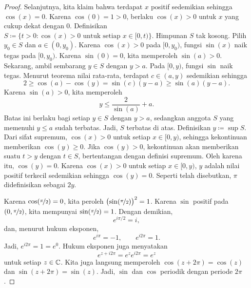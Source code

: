 \begin{proof}
Selanjutnya, kita klaim bahwa terdapat $x$ positif sedemikian sehingga $\cos(x) = 0$.
Karena $\cos(0) = 1 > 0$, berlaku $\cos(x) > 0$
untuk $x$ yang cukup dekat dengan $0$. Definisikan
$S \coloneqq \{ t > 0 : \cos(x) > 0 \text{ untuk setiap } x \in [0,t) \}$.
Himpunan $S$ tak kosong. Pilih $y_0 \in S$ dan $a \in (0,y_0)$.
Karena $\cos(x) > 0$ pada $[0,y_0)$, fungsi $\sin(x)$ naik tegas
pada $[0,y_0)$. Karena $\sin(0) = 0$, kita memperoleh $\sin(a) > 0$.
Sekarang, ambil sembarang $y \in S$ dengan $y > a$. Pada $[0,y)$,
fungsi $\sin$ naik tegas. Menurut teorema nilai rata-rata,
terdapat $c \in (a,y)$ sedemikian sehingga
\begin{equation*}
2 \geq \cos(a)-\cos(y) = \sin(c)(y-a) \geq \sin(a)(y-a) .
\end{equation*}
Karena $\sin(a) > 0$, kita memperoleh
\begin{equation*}
y \leq \frac{2}{\sin(a)} + a .
\end{equation*}
Batas ini berlaku bagi setiap $y \in S$ dengan $y > a$, sedangkan anggota $S$
yang memenuhi $y \leq a$ sudah terbatas. Jadi, $S$ terbatas di atas. Definisikan
$y \coloneqq \sup S$. Dari sifat supremum, $\cos(x) > 0$ untuk setiap $x \in [0,y)$,
sehingga kekontinuan memberikan $\cos(y) \geq 0$. Jika $\cos(y) > 0$, kekontinuan
akan memberikan suatu $t > y$ dengan $t \in S$, bertentangan dengan definisi supremum.
Oleh karena itu, $\cos(y) = 0$. Karena $\cos(x) > 0$ untuk setiap $x \in [0,y)$,
$y$ adalah nilai positif terkecil sedemikian sehingga $\cos(y) = 0$. Seperti telah disebutkan,
$\pi$ didefinisikan sebagai $2y$.

Karena $\cos(\nicefrac{\pi}{2}) = 0$, kita peroleh
${\bigl(\sin(\nicefrac{\pi}{2})\bigr)}^2 = 1$.
Karena $\sin$ positif pada $(0,\nicefrac{\pi}{2})$, kita mempunyai
$\sin(\nicefrac{\pi}{2}) = 1$.
Dengan demikian,
\begin{equation*}
e^{i \pi /2} = i ,
\end{equation*}
dan, menurut hukum eksponen,
\begin{equation*}
e^{i \pi} = -1 ,
\qquad 
e^{i 2\pi} = 1 .
\end{equation*}
Jadi, $e^{i2\pi} = 1 = e^0$. Hukum eksponen juga menyatakan
\begin{equation*}
e^{z+i2\pi} = e^z e^{i2\pi} = e^z
\end{equation*}
untuk setiap $z \in {\mathbb{C}}$. Kita juga langsung memperoleh
$\cos(z+2\pi) = \cos(z)$ dan $\sin(z+2\pi) = \sin(z)$.
Jadi, $\sin$ dan $\cos$ periodik dengan periode $2\pi$.


\end{proof}
